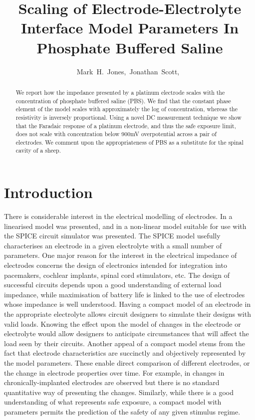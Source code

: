 \documentclass[10pt,final,journal]{IEEEtran}
\title{Scaling of Electrode-Electrolyte Interface Model Parameters In Phosphate Buffered Saline}
\author{Mark~H.~Jones,~Jonathan~Scott,~\IEEEmembership{Senior Member,~IEEE}}
\begin{document}
\maketitle

\begin{abstract}
We report how the impedance presented by a platinum electrode scales with the concentration of phosphate buffered saline (PBS). 
We find that the constant phase element of the model scales with approximately the log of concentration, whereas the resistivity is inversely proportional. 
Using a novel DC measurement technique we show that the Faradaic response of a platinum electrode, and thus the safe exposure limit, does not scale with concentration below 900\thinspace mV overpotential across a pair of electrodes. 
We comment upon the appropriateness of PBS as a substitute for the spinal cavity of a sheep.
\end{abstract}


\section{Introduction}
There is considerable interest in the electrical modelling of electrodes. \cite{Cogan2008,Troy2006}
In \cite{Franks2005} a linearised model was presented, and in \cite{ScottSingle2013} a non-linear model
suitable for use with the SPICE circuit simulator was presented. The SPICE model usefully characterises an electrode in a given electrolyte with a small number of parameters.
One major reason for the interest in the electrical impedance of electrodes concerns the design of electronics intended for integration into pacemakers, cochlear implants, spinal cord stimulators, etc. The design of successful circuits depends upon a good understanding of external load impedance, while maximisation of battery life is linked to the use of electrodes whose impedance is well understood.
Having a compact model of an electrode in the appropriate electrolyte allows circuit designers to simulate their designs with valid loads. Knowing the effect upon the model of changes in the electrode or electrolyte would allow designers to anticipate circumstances that will affect the load seen by their circuits. Another appeal of a compact model stems from the fact that electrode characteristics are succinctly and objectively represented by the model parameters. These enable direct comparison of different electrodes, or the change in electrode properties over time. For example, in \cite{Kane13} changes in chronically-implanted electrodes are observed but there is no standard quantitative way of presenting the changes. Similarly, while there is a good understanding of what represents safe exposure, a compact model with parameters permits the prediction of the safety of any given stimulus regime.~\cite{Merrill05}
\end{document}
